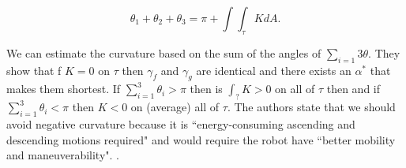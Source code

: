 \begin{equation} \label{eqn:interior-angles}
\theta_1+\theta_2+\theta_3 = \pi +\int \int_{\tau} K dA.
\end{equation}

We can estimate the curvature based on the sum of the angles of
$\sum_{i=1}3\theta$.
They show that f $K=0$ on $\tau$ then $\gamma_f$ and $\gamma_g$
are identical and there exists an $\alpha^*$ that makes them shortest.
If $\sum_{i=1}^3\theta_i>\pi$ then is $\int_?K>0$ on all of $\tau$ then and if $\sum_{i=1}^3\theta_i<\pi$
then $K<0$ on (average) all of $\tau$.
The authors state that we should avoid negative curvature because it
is ``energy-consuming ascending and descending motions required"
and would require the robot have ``better mobility and maneuverability".
.


